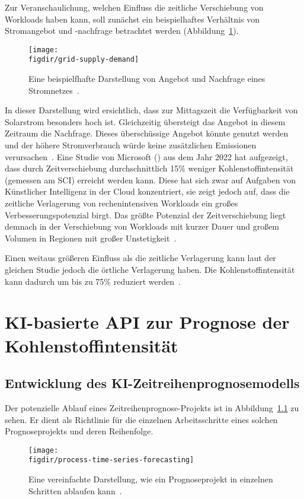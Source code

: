 Zur Veranschaulichung, welchen Einfluss die zeitliche Verschiebung von Workloads haben kann, soll zunächst ein beispielhaftes Verhältnis von Stromangebot und -nachfrage betrachtet werden (Abbildung~\ref{FIG:grid-supply-demand}).
\begin{figure}
 \caption{Eine beispielfhafte Darstellung von Angebot und Nachfrage eines Stromnetzes~\cite{Peixeiro.2022}.}
 {\texttt{[image: \\figdir/grid-supply-demand]}}
 \label{FIG:grid-supply-demand}
\end{figure}
In dieser Darstellung wird ersichtlich, dass zur Mittagszeit die Verfügbarkeit von Solarstrom besonders hoch ist.
Gleichzeitig übersteigt das Angebot in diesem Zeitraum die Nachfrage.
Dieses überschüssige Angebot könnte genutzt werden und der höhere Stromverbrauch würde keine zusätzlichen Emissionen verursachen~\cite{Buchanan.2023}.
Eine Studie von Microsoft (\cite{Dodge.06212022}) aus dem Jahr 2022 hat aufgezeigt, dass durch Zeitverschiebung durchschnittlich 15\% weniger Kohlenstoffintensität (gemessen am SCI) erreicht werden kann.
Diese hat sich zwar auf Aufgaben von Künstlicher Intelligenz in der Cloud konzentriert, sie zeigt jedoch auf, dass die zeitliche Verlagerung von rechenintensiven Workloads ein großes Verbesserungspotenzial birgt.
Das größte Potenzial der Zeitverschiebung liegt demnach in der Verschiebung von Workloads mit kurzer Dauer und großem Volumen in Regionen mit großer Unstetigkeit~\cite{Buchanan.2023}.

Einen weitaus größeren Einfluss als die zeitliche Verlagerung kann laut der gleichen Studie jedoch die örtliche Verlagerung haben.
Die Kohlenstoffintensität kann dadurch um bis zu 75\% reduziert werden~\cite{Dodge.06212022}.

\chapter{KI-basierte API zur Prognose der Kohlenstoffintensität}
\section{Entwicklung des KI-Zeitreihenprognosemodells}
Der potenzielle Ablauf eines Zeitreihenprognose-Projekts ist in Abbildung~\ref{FIG:process-time-series-forecasting} zu sehen.
Er dient als Richtlinie für die einzelnen Arbeitsschritte eines solchen Prognoseprojekts und deren Reihenfolge.

\begin{figure}
 \caption{Eine vereinfachte Darstellung, wie ein Prognoseprojekt in einzelnen Schritten ablaufen kann~\cite{Peixeiro.2022}.}
 {\texttt{[image: \\figdir/process-time-series-forecasting]}}
 \label{FIG:process-time-series-forecasting}
\end{figure}

